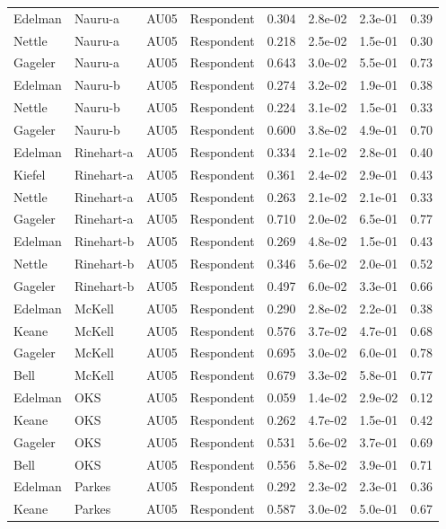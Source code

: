 \documentclass{monashthesis}
\begin{document}
\begin{center}
\begin{longtable}{llllllll}
Edelman & Nauru-a & AU05 & Respondent & 0.304 & 2.8e-02 & 2.3e-01 & 0.39 \\
Nettle & Nauru-a & AU05 & Respondent & 0.218 & 2.5e-02 & 1.5e-01 & 0.30 \\
Gageler & Nauru-a & AU05 & Respondent & 0.643 & 3.0e-02 & 5.5e-01 & 0.73 \\
Edelman & Nauru-b & AU05 & Respondent & 0.274 & 3.2e-02 & 1.9e-01 & 0.38 \\
Nettle & Nauru-b & AU05 & Respondent & 0.224 & 3.1e-02 & 1.5e-01 & 0.33 \\
Gageler & Nauru-b & AU05 & Respondent & 0.600 & 3.8e-02 & 4.9e-01 & 0.70 \\
Edelman & Rinehart-a & AU05 & Respondent & 0.334 & 2.1e-02 & 2.8e-01 & 0.40 \\
Kiefel & Rinehart-a & AU05 & Respondent & 0.361 & 2.4e-02 & 2.9e-01 & 0.43 \\
Nettle & Rinehart-a & AU05 & Respondent & 0.263 & 2.1e-02 & 2.1e-01 & 0.33 \\
Gageler & Rinehart-a & AU05 & Respondent & 0.710 & 2.0e-02 & 6.5e-01 & 0.77 \\
Edelman & Rinehart-b & AU05 & Respondent & 0.269 & 4.8e-02 & 1.5e-01 & 0.43 \\
Nettle & Rinehart-b & AU05 & Respondent & 0.346 & 5.6e-02 & 2.0e-01 & 0.52 \\
Gageler & Rinehart-b & AU05 & Respondent & 0.497 & 6.0e-02 & 3.3e-01 & 0.66 \\
Edelman & McKell & AU05 & Respondent & 0.290 & 2.8e-02 & 2.2e-01 & 0.38 \\
Keane & McKell & AU05 & Respondent & 0.576 & 3.7e-02 & 4.7e-01 & 0.68 \\
Gageler & McKell & AU05 & Respondent & 0.695 & 3.0e-02 & 6.0e-01 & 0.78 \\
Bell & McKell & AU05 & Respondent & 0.679 & 3.3e-02 & 5.8e-01 & 0.77 \\
Edelman & OKS & AU05 & Respondent & 0.059 & 1.4e-02 & 2.9e-02 & 0.12 \\
Keane & OKS & AU05 & Respondent & 0.262 & 4.7e-02 & 1.5e-01 & 0.42 \\
Gageler & OKS & AU05 & Respondent & 0.531 & 5.6e-02 & 3.7e-01 & 0.69 \\
Bell & OKS & AU05 & Respondent & 0.556 & 5.8e-02 & 3.9e-01 & 0.71 \\
Edelman & Parkes & AU05 & Respondent & 0.292 & 2.3e-02 & 2.3e-01 & 0.36 \\
Keane & Parkes & AU05 & Respondent & 0.587 & 3.0e-02 & 5.0e-01 & 0.67 \\

\end{longtable}
\end{center}
\end{document}
